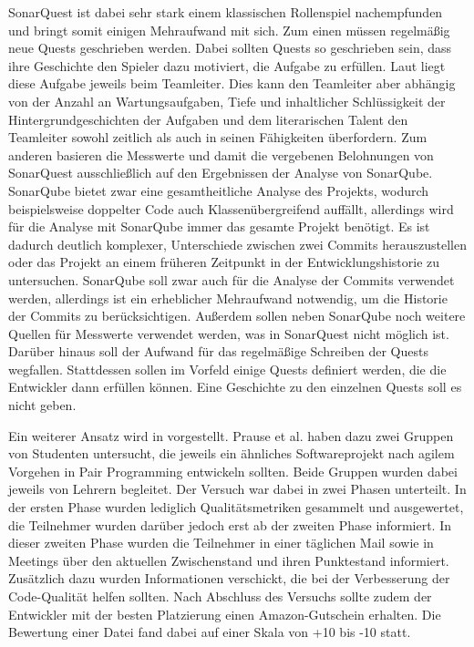\documentclass[
	oneside,  %
	ngerman, 
	final, 
	11pt, 
	a4paper, 
	1.1headlines, 
	headinclude=false, 
	footinclude=false, 
	mpinclude=false, 
	pagesize, 
	onecolumn, 
	titlepage, 
	parskip=half, 
	headsepline, 
	chapterprefix=false, 
	version=first, 
	listof=totoc, 
	bibliography=totoc, 
	toc=graduated, 
	fleqn
]{scrbook}
\begin{document}
SonarQuest ist dabei sehr stark einem klassischen Rollenspiel nachempfunden und bringt somit einigen Mehraufwand mit sich.
Zum einen müssen regelmäßig neue Quests geschrieben werden.
Dabei sollten Quests so geschrieben sein, dass ihre Geschichte den Spieler dazu motiviert, die Aufgabe zu erfüllen.
Laut \cite{SonarQuest} liegt diese Aufgabe jeweils beim Teamleiter.
Dies kann den Teamleiter aber abhängig von der Anzahl an Wartungsaufgaben, Tiefe und inhaltlicher Schlüssigkeit der Hintergrundgeschichten der Aufgaben und dem literarischen Talent den Teamleiter sowohl zeitlich als auch in seinen Fähigkeiten überfordern.
Zum anderen basieren die Messwerte und damit die vergebenen Belohnungen von SonarQuest ausschließlich auf den Ergebnissen der Analyse von SonarQube.
SonarQube bietet zwar eine gesamtheitliche Analyse des Projekts, wodurch beispielsweise doppelter Code auch Klassenübergreifend auffällt, allerdings wird für die Analyse mit SonarQube immer das gesamte Projekt benötigt.
Es ist dadurch deutlich komplexer, Unterschiede zwischen zwei Commits herauszustellen oder das Projekt an einem früheren Zeitpunkt in der Entwicklungshistorie zu untersuchen.
SonarQube soll zwar auch für die Analyse der Commits verwendet werden, allerdings ist ein erheblicher Mehraufwand notwendig, um die Historie der Commits zu berücksichtigen.
Außerdem sollen neben SonarQube noch weitere Quellen für Messwerte verwendet werden, was in SonarQuest nicht möglich ist.
Darüber hinaus soll der Aufwand für das regelmäßige Schreiben der Quests wegfallen.
Stattdessen sollen im Vorfeld einige Quests definiert werden, die die Entwickler dann erfüllen können.
Eine Geschichte zu den einzelnen Quests soll es nicht geben.

Ein weiterer Ansatz wird in \cite{Prause2012} vorgestellt. 
Prause et al. haben dazu zwei Gruppen von Studenten untersucht, die jeweils ein ähnliches Softwareprojekt nach agilem Vorgehen in Pair Programming entwickeln sollten.
Beide Gruppen wurden dabei jeweils von Lehrern begleitet.
Der Versuch war dabei in zwei Phasen unterteilt.
In der ersten Phase wurden lediglich Qualitätsmetriken gesammelt und ausgewertet, die Teilnehmer wurden darüber jedoch erst ab der zweiten Phase informiert.
In dieser zweiten Phase wurden die Teilnehmer in einer täglichen Mail sowie in Meetings über den aktuellen Zwischenstand und ihren Punktestand informiert.
Zusätzlich dazu wurden Informationen verschickt, die bei der Verbesserung der Code-Qualität helfen sollten.
Nach Abschluss des Versuchs sollte zudem der Entwickler mit der besten Platzierung einen Amazon-Gutschein erhalten.
Die Bewertung einer Datei fand dabei auf einer Skala von +10 bis -10 statt.
\end{document}
